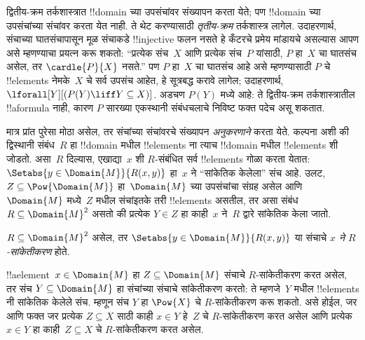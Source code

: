 \documentclass[../../../include/open-logic-section]{subfiles}
\begin{document}


\begin{explain}
द्वितीय-क्रम तर्कशास्त्रात !!{domain} च्या उपसंचांवर
संख्यापन करता येते; पण !!{domain} च्या उपसंचांच्या
संचांवर करता येत नाही. ते थेट करण्यासाठी
\emph{तृतीय-क्रम} तर्कशास्त्र लागेल. उदाहरणार्थ,
संचाच्या घातसंचापासून मूळ संचाकडे !!{injective}
फलन नसते हे कँटरचे प्रमेय मांडायचे असल्यास आपण
असे म्हणण्याचा प्रयत्न करू शकतो: ``प्रत्येक
संच~$X$ आणि प्रत्येक संच~$P$ यांसाठी, $P$
हा~$X$ चा घातसंच असेल, तर
$\cardle{P}{X}$ नसते.'' पण $P$ हा~$X$ चा
घातसंच आहे असे म्हणण्यासाठी $P$ चे !!{element}s
नेमके~$X$ चे सर्व उपसंच आहेत, हे सूत्रबद्ध करावे
लागेल; उदाहरणार्थ,
$\lforall[Y][(P(Y) \liff Y \subseteq X)]$.
अडचण $P(Y)$ मध्ये आहे: ते द्वितीय-क्रम
तर्कशास्त्रातील !!a{formula} नाही, कारण
$P$ सारख्या एकस्थानी संबंधचलाचे निविष्ट फक्त
पदेच असू शकतात.

मात्र प्रांत पुरेसा मोठा असेल, तर संचांच्या संचांवरचे
संख्यापन \emph{अनुकरणाने} करता येते. कल्पना अशी
की द्विस्थानी संबंध~$R$ हा !!{domain} मधील
!!{element}s ना त्याच !!{domain} मधील
!!{element}s शी जोडतो. असा~$R$ दिल्यास,
एखाद्या~$x$ शी $R$-संबंधित सर्व !!{element}s
गोळा करता येतात: $\Setabs{y \in
  \Domain{M}}{R(x,y)}$ हा~$x$ ने
``सांकेतिक केलेला'' संच आहे. उलट,
$Z \subseteq \Pow{\Domain{M}}$ हा~$\Domain{M}$
च्या उपसंचांचा संग्रह असेल आणि~$\Domain{M}$
मध्ये~$Z$ मधील संचांइतके तरी !!{element}s
असतील, तर असा संबंध~$R \subseteq \Domain{M}^2$
असतो की प्रत्येक $Y \in Z$ हा
काही~$x$ ने~$R$ द्वारे सांकेतिक केला जातो.
\end{explain}

\begin{defn}
$R \subseteq \Domain{M}^2$ असेल, तर
$\Setabs{y \in \Domain{M}}{R(x, y)}$ या संचाचे
\emph{$x$ ने $R$-सांकेतीकरण} होते.
\end{defn}

!!a{element}~$x \in \Domain{M}$ हा
$Z \subseteq \Domain{M}$ संचाचे $R$-सांकेतीकरण
करत असेल, तर संच $Y \subseteq \Domain{M}$ हा
संचांच्या संचाचे सांकेतीकरण करतो: ते म्हणजे~$Y$
मधील !!{element}s नी सांकेतिक केलेले संच.
म्हणून संच $Y$ हा $\Pow{X}$ चे
$R$-सांकेतीकरण करू शकतो. असे होईल, जर
आणि फक्त जर प्रत्येक $Z \subseteq X$ साठी
काही $x \in Y$ हे~$Z$ चे $R$-सांकेतीकरण
करत असेल आणि प्रत्येक $x \in Y$ हा
काही~$Z \subseteq X$ चे $R$-सांकेतीकरण करत असेल.
\end{document}
